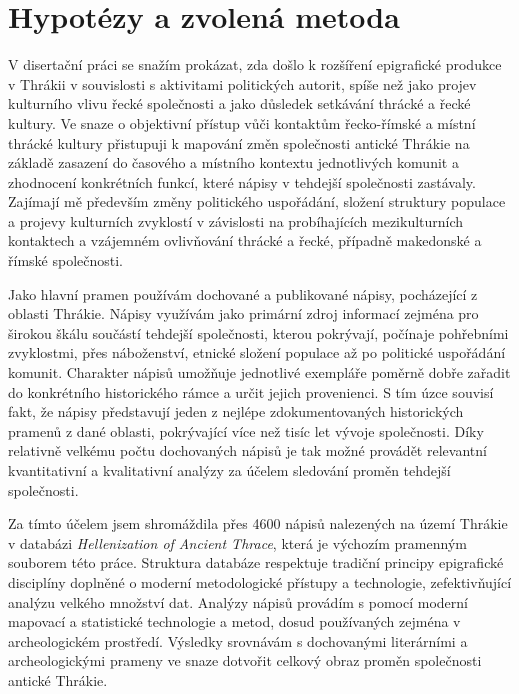 
\section[hypotézy-a-zvolená-metoda]{Hypotézy a zvolená metoda}

V disertační práci se snažím prokázat, zda došlo k rozšíření epigrafické produkce v Thrákii v souvislosti s aktivitami politických autorit, spíše než jako projev kulturního vlivu řecké společnosti a jako důsledek setkávání thrácké a řecké kultury. Ve snaze o objektivní přístup vůči kontaktům řecko-římské a místní thrácké kultury přistupuji k mapování změn společnosti antické Thrákie na základě zasazení do časového a místního kontextu jednotlivých komunit a zhodnocení konkrétních funkcí, které nápisy v tehdejší společnosti zastávaly. Zajímají mě především změny politického uspořádání, složení struktury populace a projevy kulturních zvyklostí v závislosti na probíhajících mezikulturních kontaktech a vzájemném ovlivňování thrácké a řecké, případně makedonské a římské společnosti.

Jako hlavní pramen používám dochované a publikované nápisy, pocházející z oblasti Thrákie. Nápisy využívám jako primární zdroj informací zejména pro širokou škálu součástí tehdejší společnosti, kterou pokrývají, počínaje pohřebními zvyklostmi, přes náboženství, etnické složení populace až po politické uspořádání komunit. Charakter nápisů umožňuje jednotlivé exempláře poměrně dobře zařadit do konkrétního historického rámce a určit jejich provenienci. S tím úzce souvisí fakt, že nápisy představují jeden z nejlépe zdokumentovaných historických pramenů z dané oblasti, pokrývající více než tisíc let vývoje společnosti. Díky relativně velkému počtu dochovaných nápisů je tak možné provádět relevantní kvantitativní a kvalitativní analýzy za účelem sledování proměn tehdejší společnosti.

Za tímto účelem jsem shromáždila přes 4600 nápisů nalezených na území Thrákie v databázi {\em Hellenization of Ancient Thrace}, která je výchozím pramenným souborem této práce. Struktura databáze respektuje tradiční principy epigrafické disciplíny doplněné o moderní metodologické přístupy a technologie, zefektivňující analýzu velkého množství dat. Analýzy nápisů provádím s pomocí moderní mapovací a statistické technologie a metod, dosud používaných zejména v archeologickém prostředí. Výsledky srovnávám s dochovanými literárními a archeologickými prameny ve snaze dotvořit celkový obraz proměn společnosti antické Thrákie.

